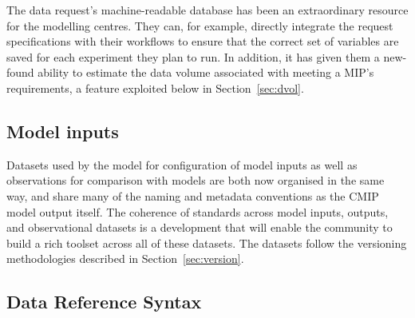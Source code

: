 \documentclass[gmd,manuscript]{copernicus}
\begin{document}
The data request's machine-readable database has been an extraordinary
resource for the modelling centres. They can, for example, directly
integrate the request specifications with their workflows to ensure
that the correct set of variables are saved for each experiment they
plan to run. In addition, it has given them a new-found ability to
estimate the data volume associated with meeting a MIP's requirements,
a feature exploited below in Section~\ref{sec:dvol}.

\subsection{Model inputs}
\label{sec:data-inputs}

Datasets used by the model for configuration of model inputs
\citep[\texttt{Input Datasets for Model Intercomparison Projects)
  input4MIPs}, see][]{ref:duracketal2018} as well as observations for
comparison with models \citep[\texttt{Observations for Model
  Intercomparison Projects) obs4MIPs},
see][]{ref:teixeiraetal2014,ref:ferraroetal2015} are both now
organised in the same way, and share many of the naming and metadata
conventions as the CMIP model output itself. The coherence of
standards across model inputs, outputs, and observational datasets is
a development that will enable the community to build a rich toolset
across all of these datasets. The datasets follow the versioning
methodologies described in Section~\ref{sec:version}.

\subsection{Data Reference Syntax}
\label{sec:data-drs}
\end{document}
